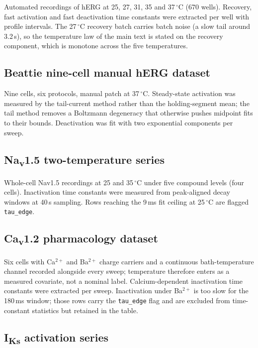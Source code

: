 \documentclass[11pt,a4paper]{article}
\begin{document}
Automated recordings of hERG at 25, 27, 31, 35 and 37\,$^\circ$C (670 wells).
Recovery, fast activation and fast deactivation time constants were extracted
per well with profile intervals. The 27\,$^\circ$C recovery batch carries
batch noise (a slow tail around 3.2\,s), so the temperature law of the main
text is stated on the recovery component, which is monotone across the five
temperatures.

\subsection{Beattie nine-cell manual hERG dataset}

Nine cells, six protocols, manual patch at 37\,$^\circ$C. Steady-state
activation was measured by the tail-current method rather than the
holding-segment mean; the tail method removes a Boltzmann degeneracy that
otherwise pushes midpoint fits to their bounds. Deactivation was fit with two
exponential components per sweep.

\subsection{Na\textsubscript{v}1.5 two-temperature series}

Whole-cell Nav1.5 recordings at 25 and 35\,$^\circ$C under five compound
levels (four cells). Inactivation time constants were measured from
peak-aligned decay windows at 40\,\textmu s sampling. Rows reaching the
9\,ms fit ceiling at 25\,$^\circ$C are flagged \texttt{tau\_edge}.

\subsection{Ca\textsubscript{v}1.2 pharmacology dataset}

Six cells with Ca$^{2+}$ and Ba$^{2+}$ charge carriers and a continuous
bath-temperature channel recorded alongside every sweep; temperature therefore
enters as a measured covariate, not a nominal label. Calcium-dependent
inactivation time constants were extracted per sweep. Inactivation under
Ba$^{2+}$ is too slow for the 180\,ms window; those rows carry the
\texttt{tau\_edge} flag and are excluded from time-constant statistics but
retained in the table.

\subsection{I\textsubscript{Ks} activation series}
\end{document}
